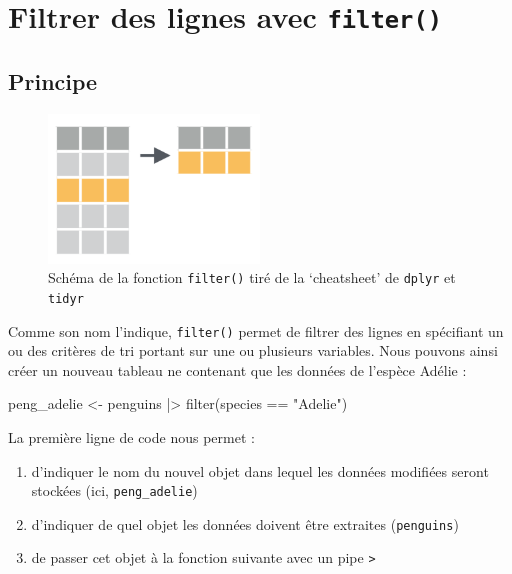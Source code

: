 \documentclass[
  a4paper,
  DIV=11,
  numbers=noendperiod,
  oneside]{scrreprt}
\newenvironment{Shaded}{}{}
\newcommand{\FunctionTok}[1]{\textcolor[rgb]{0.44,0.26,0.76}{#1}}
\newcommand{\NormalTok}[1]{\textcolor[rgb]{0.14,0.16,0.18}{#1}}
\newcommand{\OtherTok}[1]{\textcolor[rgb]{0.44,0.26,0.76}{#1}}
\newcommand{\SpecialCharTok}[1]{\textcolor[rgb]{0.00,0.36,0.77}{#1}}
\newcommand{\StringTok}[1]{\textcolor[rgb]{0.01,0.18,0.38}{#1}}
\providecommand{\tightlist}{%
  \setlength{\itemsep}{0pt}\setlength{\parskip}{0pt}}\usepackage{longtable,booktabs,array}
\begin{document}
\section{\texorpdfstring{Filtrer des lignes avec
\texttt{filter()}}{Filtrer des lignes avec filter()}}\label{filtrer-des-lignes-avec-filter}

\subsection{Principe}\label{principe}

\begin{figure}[H]

{\centering \includegraphics[width=0.5\textwidth,height=\textheight]{images/filter.png}

}

\caption{Schéma de la fonction \texttt{filter()} tiré de la `cheatsheet'
de \texttt{dplyr} et \texttt{tidyr}}

\end{figure}%

Comme son nom l'indique, \texttt{filter()} permet de filtrer des lignes
en spécifiant un ou des critères de tri portant sur une ou plusieurs
variables. Nous pouvons ainsi créer un nouveau tableau ne contenant que
les données de l'espèce Adélie :

\begin{Shaded}
\begin{Highlighting}[]
\NormalTok{peng\_adelie }\OtherTok{\textless{}{-}}\NormalTok{ penguins }\SpecialCharTok{|\textgreater{}} 
  \FunctionTok{filter}\NormalTok{(species }\SpecialCharTok{==} \StringTok{"Adelie"}\NormalTok{)}
\end{Highlighting}
\end{Shaded}

La première ligne de code nous permet :

\begin{enumerate}
\def\labelenumi{\arabic{enumi}.}
\tightlist
\item
  d'indiquer le nom du nouvel objet dans lequel les données modifiées
  seront stockées (ici, \texttt{peng\_adelie})
\item
  d'indiquer de quel objet les données doivent être extraites
  (\texttt{penguins})
\item
  de passer cet objet à la fonction suivante avec un pipe
  \texttt{\textbar{}\textgreater{}}
\end{enumerate}
\end{document}
